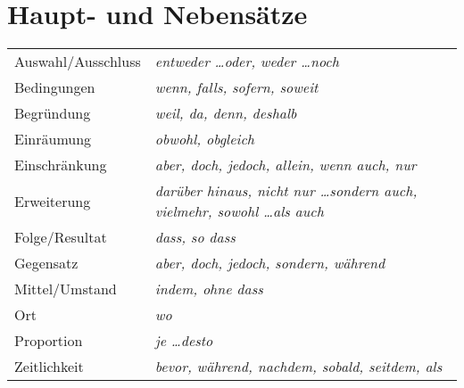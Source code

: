 \section{Haupt- und Nebensätze}
\settowidth{\MyLenA}{Auswahl/Ausschluss~~}
\begin{tabular}{@{}p{\the\MyLenA}%
				@{}p{\linewidth-\the\MyLenA}}
	Auswahl/Ausschluss 	& \textit{entweder \dots oder, weder \dots noch}\\
	Bedingungen			& \textit{wenn, falls, sofern, soweit}\\
	Begründung			& \textit{weil, da, denn, deshalb}\\
	Einräumung			& \textit{obwohl, obgleich}\\
	Einschränkung		& \textit{aber, doch, jedoch, allein, wenn auch, nur}\\
	Erweiterung			& \textit{darüber hinaus, nicht nur \dots sondern auch, vielmehr, sowohl \dots als auch}\\
	Folge/Resultat		& \textit{dass, so dass}\\
	Gegensatz			& \textit{aber, doch, jedoch, sondern, während}\\
	Mittel/Umstand		& \textit{indem, ohne dass}\\
	Ort					& \textit{wo}\\
	Proportion			& \textit{je \dots desto}\\
	Zeitlichkeit		& \textit{bevor, während, nachdem, sobald, seitdem, als}\\
\end{tabular}